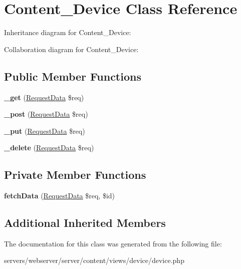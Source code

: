 \hypertarget{class_lora_1_1_content_1_1_content___device}{}\section{Content\+\_\+\+Device Class Reference}
\label{class_lora_1_1_content_1_1_content___device}


Inheritance diagram for Content\+\_\+\+Device\+:


Collaboration diagram for Content\+\_\+\+Device\+:
\subsection*{Public Member Functions}
\begin{DoxyCompactItemize}
\item 
\mbox{\label{class_lora_1_1_content_1_1_content___device_a3ad4bf1b146a3180b34d1327ff2abf69}} 
{\bfseries \+\_\+get} (\hyperlink{class_request_data}{Request\+Data} \$req)
\item 
\mbox{\label{class_lora_1_1_content_1_1_content___device_a50751d47a139282d1c3b08cab1b6562e}} 
{\bfseries \+\_\+post} (\hyperlink{class_request_data}{Request\+Data} \$req)
\item 
\mbox{\label{class_lora_1_1_content_1_1_content___device_a2affcc8f31c13147c33450193b229194}} 
{\bfseries \+\_\+put} (\hyperlink{class_request_data}{Request\+Data} \$req)
\item 
\mbox{\label{class_lora_1_1_content_1_1_content___device_ab8ddc6de1e04524212f7d55893f78864}} 
{\bfseries \+\_\+delete} (\hyperlink{class_request_data}{Request\+Data} \$req)
\end{DoxyCompactItemize}
\subsection*{Private Member Functions}
\begin{DoxyCompactItemize}
\item 
\mbox{\label{class_lora_1_1_content_1_1_content___device_a9ff3b3604c524ec2caf3e201ca0ca298}} 
{\bfseries fetch\+Data} (\hyperlink{class_request_data}{Request\+Data} \$req, \$id)
\end{DoxyCompactItemize}
\subsection*{Additional Inherited Members}


The documentation for this class was generated from the following file\+:\begin{DoxyCompactItemize}
\item 
servers/webserver/server/content/views/device/device.\+php\end{DoxyCompactItemize}
